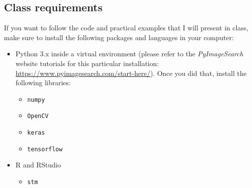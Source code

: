 \documentclass[11pt]{article}
\begin{document}
\begin{flushleft}
\section{Class requirements}
If you want to follow the code and practical examples that I will present in class, make sure to install the following packages and languages in your computer:

\begin{itemize}
	\item Python 3.x inside a virtual environment (please refer to the \emph{PyImageSearch} website tutorials for this particular installation: \url{https://www.pyimagesearch.com/start-here/}). Once you did that, install the following libraries:
	\begin{itemize}
		\item \texttt{numpy}
		\item \texttt{OpenCV}
		\item \texttt{keras}
		\item \texttt{tensorflow}
	\end{itemize}
	\item R and RStudio
	\begin{itemize}
		\item \texttt{stm}
	\end{itemize}
\end{itemize}


\end{flushleft}
\end{document}
